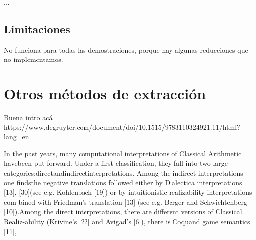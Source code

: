 ...

\subsection{Limitaciones}

No funciona para todas las demostraciones, porque hay algunas reducciones que no implementamos.

\section{Otros métodos de extracción}


Buena intro acá https://www.degruyter.com/document/doi/10.1515/9783110324921.11/html?lang=en

In the past years, many computational interpretations of Classical Arithmetic havebeen put forward.  Under a first classification, they fall into two large categories:directandindirectinterpretations.   Among  the  indirect  interpretations  one  findsthe  negative  translations  followed  either  by  Dialectica  interpretations  [13],  [30](see e.g.   Kohlenbach [19]) or by intuitionistic realizability interpretations com-bined with Friedman’s translation [13] (see e.g. Berger and Schwichtenberg [10]).Among the direct interpretations, there are different versions of Classical Realiz-ability (Krivine’s [22] and Avigad’s [6]), there is Coquand game semantics [11],